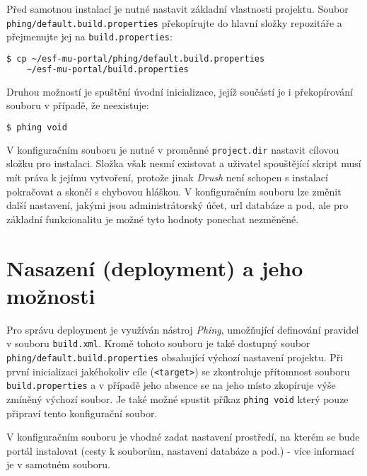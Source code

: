 Před samotnou instalací je nutné nastavit základní vlastnosti projektu. Soubor \texttt{phing/default.build.properties} překopírujte do hlavní složky repozitáře a přejmenujte jej na \texttt{build.properties}:

\begin{lstlisting}[language=bash]
  $ cp ~/esf-mu-portal/phing/default.build.properties 
    ~/esf-mu-portal/build.properties
\end{lstlisting}

Druhou možností je spuštění úvodní inicializace, jejíž součástí je i překopírování souboru v případě, že neexistuje:

\begin{lstlisting}[language=bash]
  $ phing void
\end{lstlisting}

V konfiguračním souboru je nutné v proměnné \texttt{project.dir} nastavit cílovou složku pro instalaci. Složka však nesmí existovat a uživatel spouštějící skript musí mít práva k jejímu vytvoření, protože jinak \emph{Drush} není schopen s instalací pokračovat a skončí s chybovou hláškou. V konfiguračním souboru lze změnit další nastavení, jakými jsou administrátorský účet, url databáze a pod, ale pro základní funkcionalitu je možné tyto hodnoty ponechat nezměněné.


\section{Nasazení (deployment) a jeho možnosti}

Pro správu \gls{deployment} je využíván nástroj \emph{Phing}, umožňující definování pravidel v souboru \texttt{build.xml}. Kromě tohoto souboru je také dostupný soubor \linebreak \texttt{phing/\-default.build.properties} obsahující výchozí nastavení projektu. Při první inicializaci jakéhokoliv cíle (\texttt{<target>}) se zkontroluje přítomnost souboru \linebreak \texttt{build.properties} a v případě jeho absence se na jeho místo zkopíruje výše zmíněný výchozí soubor. Je také možné spustit příkaz \texttt{phing void} který pouze připraví tento konfigurační soubor. 

V konfiguračním souboru je vhodné zadat nastavení prostředí, na kterém se bude portál instalovat (cesty k souborům, nastavení databáze a pod.) - více informací je v samotném souboru.

